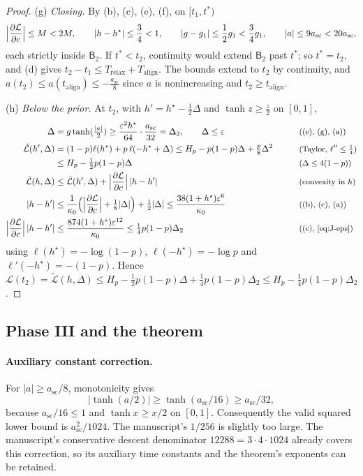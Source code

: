 \begin{proof}
\smallskip\noindent(g) \emph{Closing.} By (b), (c), (e), (f), on $[t_1,t^\ast)$
\[
 \Bigl|\pd{\mathcal L}{c}\Bigr|\le M<2M,\qquad |h-h^\star|\le\frac{3}{4}<1,\qquad |g-g_1|\le\frac{1}{2}g_1<\frac{3}{4}g_1,\qquad |a|\le9a_{\mathrm{sc}}<20a_{\mathrm{sc}},
\]
each strictly inside $\mathsf B_2$. If $t^\ast<t_2$, continuity would extend $\mathsf B_2$ past $t^\ast$; so $t^\ast=t_2$, and (d) gives
$t_2-t_1\le T_{\mathrm{relax}}+T_{\mathrm{align}}$. The bounds extend to $t_2$ by continuity, and $a(t_2)\le a(t_{\mathrm{align}})\le-\frac{a_{\mathrm{sc}}}{8}$ since $a$ is
nonincreasing and $t_2\ge t_{\mathrm{align}}$.

\smallskip\noindent(h) \emph{Below the prior.} At $t_2$, with $h'=h^\star-\frac{1}{2}\Delta$ and $\tanh z\ge\frac{z}{2}$ on $[0,1]$,
\begin{alignat*}{2}
 \Delta&=g\tanh(\tfrac{|a|}{2})\ge\frac{\initscale^2h^\star}{64}\cdot\frac{a_{\mathrm{sc}}}{32}=\Delta_2,\qquad \Delta\le\initscale &\qquad& \why{(e), (g), (a)}\\
 \tilde{\mathcal L}(h',\Delta)&=(1-p)\ell(h^\star)+p\,\ell(-h^\star+\Delta)\le H_p-p(1-p)\Delta+\tfrac{p}{8}\Delta^2 && \why{Taylor, $\ell''\le\tfrac{1}{4}$}\\
 &\le H_p-\tfrac{1}{2}p(1-p)\Delta && \why{$\Delta\le4(1-p)$}\\
 \tilde{\mathcal L}(h,\Delta)&\le\tilde{\mathcal L}(h',\Delta)+\Bigl|\pd{\mathcal L}{c}\Bigr|\,|h-h'| && \why{convexity in $h$}\\
 |h-h'|&\le\frac{1}{\kappa_0}\Bigl(\Bigl|\pd{\mathcal L}{c}\Bigr|+\tfrac{1}{8}|\Delta|\Bigr)+\tfrac{1}{2}|\Delta|\le\frac{38(1+h^\star)\initscale^6}{\kappa_0} && \why{(b), (c), (a)}\\
 \Bigl|\pd{\mathcal L}{c}\Bigr|\,|h-h'|&\le\frac{874(1+h^\star)\initscale^{12}}{\kappa_0}\le\tfrac{1}{4}p(1-p)\Delta_2 && \why{(c), \cref{eq:J-eps}}
\end{alignat*}
using $\ell(h^\star)=-\log(1-p)$, $\ell(-h^\star)=-\log p$ and $\ell'(-h^\star)=-(1-p)$. Hence
$\mathcal L(t_2)=\tilde{\mathcal L}(h,\Delta)\le H_p-\frac{1}{2}p(1-p)\Delta+\frac{1}{4}p(1-p)\Delta_2\le H_p-\frac{1}{4}p(1-p)\Delta_2$.
\end{proof}

\subsection{Phase III and the theorem}

\paragraph{Auxiliary constant correction.} For $|a|\ge a_{\mathrm{sc}}/8$, monotonicity gives\[|\tanh(a/2)|\ge\tanh(a_{\mathrm{sc}}/16)\ge a_{\mathrm{sc}}/32,\]because $a_{\mathrm{sc}}/16\le1$ and $\tanh x\ge x/2$ on $[0,1]$. Consequently the valid squared lower bound is $a_{\mathrm{sc}}^2/1024$. The manuscript's $1/256$ is slightly too large. The manuscript's conservative descent denominator $12288=3\cdot4\cdot1024$ already covers this correction, so its auxiliary time constants and the theorem's exponents can be retained.

